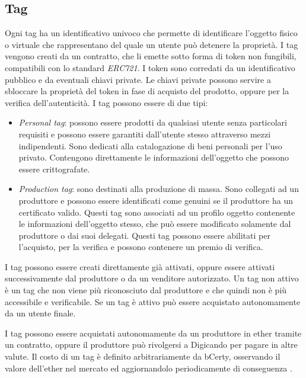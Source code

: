 \subsection{Tag}
\label{tag}
Ogni tag ha un identificativo univoco che permette di identificare l'oggetto fisico o virtuale che rappresentano del quale un utente può detenere la proprietà. I tag vengono creati da un contratto, che li emette sotto forma di token non fungibili, compatibili con lo standard \emph{ERC721}. I token sono corredati da un identificativo pubblico e da eventuali chiavi private. Le chiavi private possono servire a sbloccare la proprietà del token in fase di acquisto del prodotto, oppure per la verifica dell'autenticità.
I tag possono essere di due tipi:
\begin{itemize}
    \item \emph{Personal tag}: possono essere prodotti da qualsiasi utente senza particolari requisiti e possono essere garantiti dall'utente stesso attraverso mezzi indipendenti. Sono dedicati alla catalogazione di beni personali per l'uso privato. Contengono direttamente le informazioni dell'oggetto che possono essere crittografate.
    \item \emph{Production tag}: sono destinati alla produzione di massa. Sono collegati ad un produttore e possono essere identificati come genuini se il produttore ha un certificato valido. Questi tag sono associati ad un profilo oggetto contenente le informazioni dell'oggetto stesso, che può essere modificato solamente dal produttore o dai suoi delegati. Questi tag possono essere abilitati per l'acquisto, per la verifica e possono contenere un premio di verifica.
\end{itemize}

I tag possono essere creati direttamente già attivati, oppure essere attivati successivamente dal produttore o da un venditore autorizzato. Un tag non attivo è un tag che non viene più riconosciuto dal produttore e che quindi non è più accessibile e verificabile. Se un tag è attivo può essere acquistato autonomamente da un utente finale.

I tag possono essere acquistati autonomamente da un produttore in ether tramite un contratto, oppure il produttore può rivolgersi a Digicando per pagare in altre valute. Il costo di un tag è definito arbitrariamente da bCerty, osservando il valore dell'ether nel mercato ed aggiornandolo periodicamente di conseguenza \cite{bCerty-whitepaper}.

